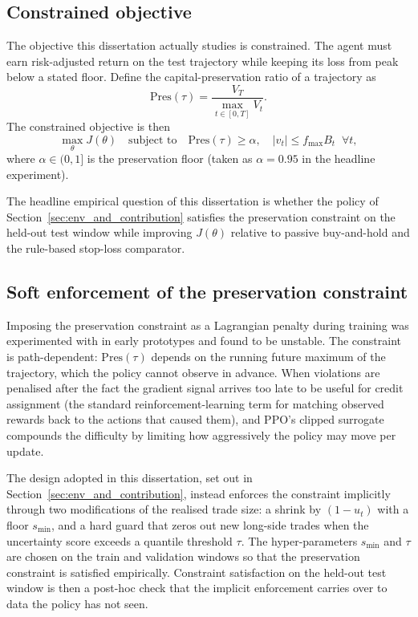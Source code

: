 \subsection{Constrained objective}
\label{sec:constrained_objective}

The objective this dissertation actually studies is constrained. The agent must earn risk-adjusted return on the test trajectory while keeping its loss from peak below a stated floor. Define the capital-preservation ratio of a trajectory as
\begin{equation}
  \label{eq:preservation_ratio}
  \mathrm{Pres}(\tau) = \frac{V_T}{\max_{t \in [0, T]} V_t}.
\end{equation}
The constrained objective is then
\begin{equation}
  \label{eq:constrained_objective}
  \max_\theta J(\theta) \quad \text{subject to} \quad \mathrm{Pres}(\tau) \geq \alpha, \quad |v_t| \leq f_{\max} B_t \;\; \forall t,
\end{equation}
where $\alpha \in (0, 1]$ is the preservation floor (taken as $\alpha = 0.95$ in the headline experiment).

The headline empirical question of this dissertation is whether the policy of Section~\ref{sec:env_and_contribution} satisfies the preservation constraint on the held-out test window while improving $J(\theta)$ relative to passive buy-and-hold and the rule-based stop-loss comparator.

\subsection{Soft enforcement of the preservation constraint}
\label{sec:soft_enforcement}

Imposing the preservation constraint as a Lagrangian penalty during training was experimented with in early prototypes and found to be unstable. The constraint is path-dependent: $\mathrm{Pres}(\tau)$ depends on the running future maximum of the trajectory, which the policy cannot observe in advance. When violations are penalised after the fact the gradient signal arrives too late to be useful for credit assignment (the standard reinforcement-learning term for matching observed rewards back to the actions that caused them), and PPO's clipped surrogate compounds the difficulty by limiting how aggressively the policy may move per update.

The design adopted in this dissertation, set out in Section~\ref{sec:env_and_contribution}, instead enforces the constraint implicitly through two modifications of the realised trade size: a shrink by $(1 - u_t)$ with a floor $s_{\min}$, and a hard guard that zeros out new long-side trades when the uncertainty score exceeds a quantile threshold $\tau$. The hyper-parameters $s_{\min}$ and $\tau$ are chosen on the train and validation windows so that the preservation constraint is satisfied empirically. Constraint satisfaction on the held-out test window is then a post-hoc check that the implicit enforcement carries over to data the policy has not seen.

